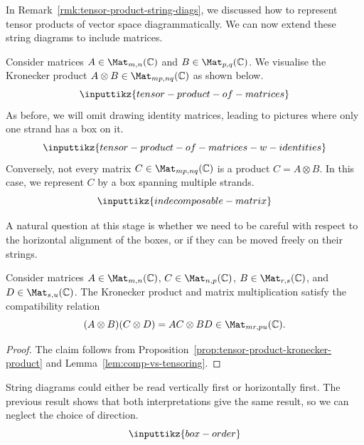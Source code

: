 \documentclass[a4paper,oneside, 12pt]{amsart}
\begin{document}
In Remark~\ref{rmk:tensor-product-string-diags}, we discussed how to represent tensor products of vector space diagrammatically.
We can now extend these string diagrams to include matrices.

\begin{remark}\label{rmk:matrices-as-string-diagrams}
  Consider matrices \(A\in \Mat_{m,n}( \mathbb{C})\) and \(B \in \Mat_{p,q}( \mathbb{C})\).
  We visualise the Kronecker product \(A\otimes B \in \Mat_{mp,nq}( \mathbb{C})\) as shown below.
  \begin{equation*}
    \inputtikz{tensor-product-of-matrices}
  \end{equation*}
  As before, we will omit drawing identity matrices, leading to pictures where only one strand has a box on it.
  \begin{equation*}
    \inputtikz{tensor-product-of-matrices-w-identities}
  \end{equation*}
  Conversely, not every matrix \(C \in \Mat_{mp,nq}(\mathbb{C})\) is a product \(C = A\otimes B\).
  In this case, we represent \(C\) by a box spanning multiple strands.
  \begin{equation*}
    \inputtikz{indecomposable-matrix}
  \end{equation*}
\end{remark}

A natural question at this stage is whether we need to be careful with respect to the horizontal alignment of the  boxes, or if they can be moved freely on their strings.

\begin{lemma}\label{lem:eck-hilton}
  Consider matrices \(A \in \Mat_{m,n}( \mathbb{C})\), \(C \in \Mat_{n,p}( \mathbb{C})\), \(B \in \Mat_{r,s}( \mathbb{C})\), and \(D \in \Mat_{s,u}( \mathbb{C})\).
  The Kronecker product and matrix  multiplication satisfy the compatibility relation
  \begin{equation}\label{eq:Kronecker-product-vs-matrix-mult}
    (A\otimes B)(C \otimes D) = AC \otimes BD \in \Mat_{mr,pu}( \mathbb{C}).
  \end{equation}
\end{lemma}
\begin{proof}
  The claim follows from Proposition~\ref{prop:tensor-product-kronecker-product} and Lemma~\ref{lem:comp-vs-tensoring}. %
\end{proof}

String diagrams could either be read vertically first or horizontally first.
The previous result shows that both interpretations give the same result, so we can neglect the choice of direction.
\begin{equation*}
  \inputtikz{box-order}
\end{equation*}
\end{document}
